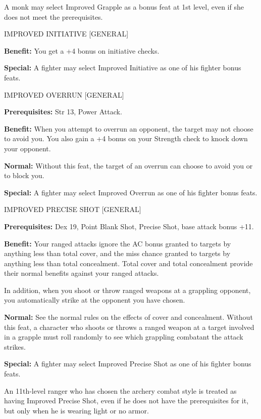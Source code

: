 \documentclass{article}
\begin{document}
A monk may select Improved Grapple as a bonus feat at 1st level, even if she does 
not meet the prerequisites.

\vspace{12pt}
IMPROVED INITIATIVE [GENERAL]

\textbf{Benefit:} You get a +4 bonus on initiative checks.

\textbf{Special:} A fighter may select Improved Initiative as one of his fighter 
bonus feats.

\vspace{12pt}
IMPROVED OVERRUN [GENERAL]

\textbf{Prerequisites:} Str 13, Power Attack.

\textbf{Benefit:} When you attempt to overrun an opponent, the target may not choose 
to avoid you. You also gain a +4 bonus on your Strength check to knock down your 
opponent.

\textbf{Normal:} Without this feat, the target of an overrun can choose to avoid 
you or to block you.

\textbf{Special:} A fighter may select Improved Overrun as one of his fighter bonus 
feats.

\vspace{12pt}
IMPROVED PRECISE SHOT [GENERAL]

\textbf{Prerequisites:} Dex 19, Point Blank Shot, Precise Shot, base attack bonus 
+11.

\textbf{Benefit:} Your ranged attacks ignore the AC bonus granted to targets by 
anything less than total cover, and the miss chance granted to targets by anything 
less than total concealment. Total cover and total concealment provide their normal 
benefits against your ranged attacks.

In addition, when you shoot or throw ranged weapons at a grappling opponent, you 
automatically strike at the opponent you have chosen.

\textbf{Normal:} See the normal rules on the effects of cover and concealment. 
Without this feat, a character who shoots or throws a ranged weapon at a target 
involved in a grapple must roll randomly to see which grappling combatant the attack 
strikes.

\textbf{Special:} A fighter may select Improved Precise Shot as one of his fighter 
bonus feats.

An 11th-level ranger who has chosen the archery combat style is treated as having 
Improved Precise Shot, even if he does not have the prerequisites for it, but only 
when he is wearing light or no armor.
\end{document}
